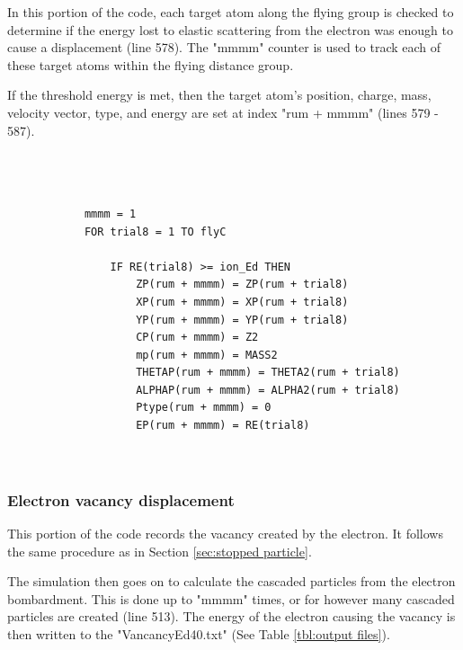 \documentclass[10pt, reqno]{exam}
\begin{document}
In this portion of the code, each target atom along the flying group is checked to determine if the energy lost to elastic scattering from the electron was enough to cause a displacement (line 578). The "mmmm" counter is used to track each of these target atoms within the flying distance group. \par

\vspace{0.5 cm}

If the threshold energy is met, then the target atom's position, charge, mass, velocity vector, type, and energy are set at index "rum + mmmm" (lines 579 - 587). \par

\begin{verbatim}
    
    
    
            mmmm = 1
            FOR trial8 = 1 TO flyC
    
                IF RE(trial8) >= ion_Ed THEN
                    ZP(rum + mmmm) = ZP(rum + trial8)
                    XP(rum + mmmm) = XP(rum + trial8)
                    YP(rum + mmmm) = YP(rum + trial8)
                    CP(rum + mmmm) = Z2
                    mp(rum + mmmm) = MASS2
                    THETAP(rum + mmmm) = THETA2(rum + trial8)
                    ALPHAP(rum + mmmm) = ALPHA2(rum + trial8)
                    Ptype(rum + mmmm) = 0
                    EP(rum + mmmm) = RE(trial8)
    
    
\end{verbatim}

\subsubsection{Electron vacancy displacement}

This portion of the code records the vacancy created by the electron. It follows the same procedure as in Section \ref{sec:stopped particle}. \par

The simulation then goes on to calculate the cascaded particles from the electron bombardment. This is done up to "mmmm" times, or for however many cascaded particles are created (line 513). The energy of the electron causing the vacancy is then written to the "VancancyEd40.txt" (See Table \ref{tbl:output files}).
\end{document}
